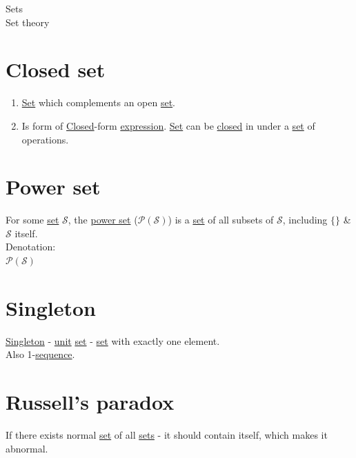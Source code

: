 \documentclass[a4paper,14pt,oneside]{book}
\begin{document}
\label{org72aaee3}Sets\\
\label{org967a954}Set theory\\

\section{\label{org7460a96}Closed set}
\label{sec:org839bad8}
\begin{enumerate}
\item \hyperref[org0f7f8fa]{Set} which complements an open \hyperref[org0f7f8fa]{set}.\\

\item Is form of \hyperref[org61442b1]{Closed}-form \hyperref[org3ea9088]{expression}. \hyperref[org0f7f8fa]{Set} can be \hyperref[org61442b1]{closed} in under a \hyperref[org0f7f8fa]{set} of operations.\\
\end{enumerate}

\section{\label{org05db14f}Power set}
\label{sec:orge373db8}
For some \hyperref[org0f7f8fa]{set} \(\mathcal{S}\), the \hyperref[org05db14f]{power set} (\(\mathcal{P(S)}\)) is a \hyperref[org0f7f8fa]{set} of all subsets of \(\mathcal{S}\), including \(\{\}\) \& \(\mathcal{S}\) itself.\\

Denotation:\\
\(\mathcal{P(S)}\)\\

\section{\label{org003befb}Singleton}
\label{sec:orgfe23cfb}
\hyperref[org003befb]{Singleton} - \hyperref[orga4edbd5]{unit} \hyperref[org0f7f8fa]{set} - \hyperref[org0f7f8fa]{set} with exactly one element.\\
Also 1-\hyperref[org5895702]{sequence}.\\

\section{\label{org967dce4}Russell's paradox}
\label{sec:org68e3a0a}
If there exists normal \hyperref[org0f7f8fa]{set} of all \hyperref[org72aaee3]{sets} - it should contain itself, which makes it abnormal.\\
\end{document}

